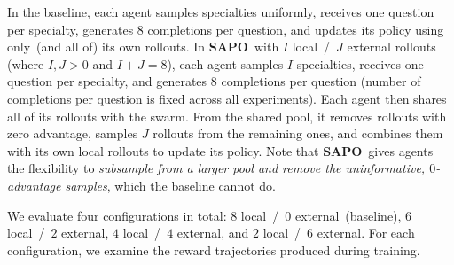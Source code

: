 \documentclass[11pt, a4paper, logo, singlecolumn, copyright]{gensyn}
\newcommand{\SAPO}{\textbf{SAPO}}
\begin{document}
In the baseline, each agent samples specialties uniformly, receives one question per specialty, generates $8$ completions per question, and updates its policy using only~(and all of) its own rollouts. In \SAPO~with $I$ local~/~$J$ external rollouts (where $I,J>0$ and $I+J=8$), each agent samples $I$ specialties, receives one question per specialty, and generates 8 completions per question (number of completions per question is fixed across all experiments). Each agent then shares all of its rollouts with the swarm. From the shared pool, it removes rollouts with zero advantage, samples $J$ rollouts from the remaining ones, and combines them with its own local rollouts to update its policy. Note that \SAPO~gives agents the flexibility to \textit{subsample from a larger pool and remove the uninformative, $0$-advantage samples}, which the baseline cannot do. 

We evaluate four configurations in total: $8$ local~/~$0$ external~(baseline), $6$ local~/~$2$ external, $4$ local~/~$4$ external, and $2$ local~/~$6$ external. For each configuration, we examine the reward trajectories produced during training.
\end{document}
